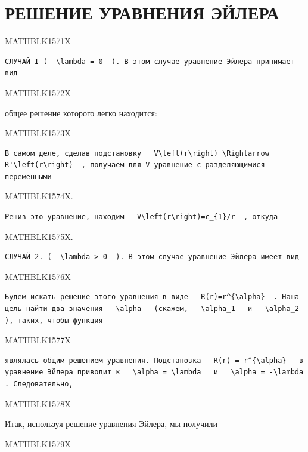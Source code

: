 \documentclass[
]{article}
\begin{document}
{{{\section{РЕШЕНИЕ УРАВНЕНИЯ
ЭЙЛЕРА}\label{ux440ux435ux448ux435ux43dux438ux435-ux443ux440ux430ux432ux43dux435ux43dux438ux44f-ux44dux439ux43bux435ux440ux430}

MATHBLK1571X

\begin{verbatim}
СЛУЧАЙ I (  \lambda = 0  ). В этом случае уравнение Эйлера принимает вид
\end{verbatim}

MATHBLK1572X

общее решение которого легко находится:

MATHBLK1573X

\begin{verbatim}
В самом деле, сделав подстановку   V\left(r\right) \Rightarrow R'\left(r\right)  , получаем для V уравнение с разделяющимися переменными
\end{verbatim}

MATHBLK1574X.

\begin{verbatim}
Решив это уравнение, находим   V\left(r\right)=c_{1}/r  , откуда
\end{verbatim}

MATHBLK1575X.

\begin{verbatim}
СЛУЧАЙ 2. (  \lambda > 0  ). В этом случае уравнение Эйлера имеет вид
\end{verbatim}

MATHBLK1576X

\begin{verbatim}
Будем искать решение этого уравнения в виде   R(r)=r^{\alpha}  . Наша цель—найти два значения   \alpha   (скажем,   \alpha_1   и   \alpha_2  ), таких, чтобы функция
\end{verbatim}

MATHBLK1577X

\begin{verbatim}
являлась общим решением уравнения. Подстановка   R(r) = r^{\alpha}   в уравнение Эйлера приводит к   \alpha = \lambda   и   \alpha = -\lambda  . Следовательно,
\end{verbatim}

MATHBLK1578X

Итак, используя решение уравнения Эйлера, мы получили

MATHBLK1579X

}}}
\end{document}
